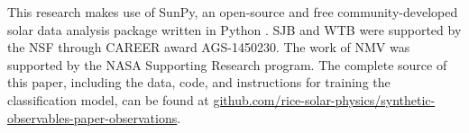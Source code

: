 \documentclass[modern,linenumbers,longauthor]{aastex63}
\begin{document}






\acknowledgments
This research makes use of SunPy, an open-source and free community-developed solar data analysis package written in Python \citep{the_sunpy_community_sunpy_2020}. 
SJB and WTB were supported by the NSF through CAREER award AGS-1450230.
The work of NMV was supported by the NASA Supporting Research program.
The complete source of this paper, including the data, code, and instructions for training the classification model, can be found at \href{https://github.com/rice-solar-physics/synthetic-observables-paper-observations}{github.com/rice-solar-physics/synthetic-observables-paper-observations}.






\listofchanges
\end{document}
